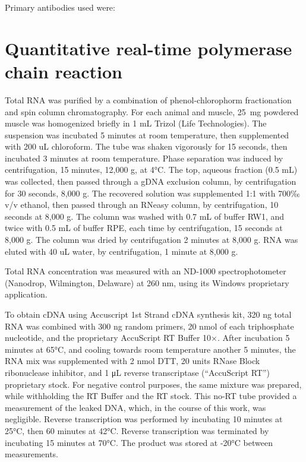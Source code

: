 \documentclass[12pt,english]{report}\usepackage[]{graphicx}\usepackage[]{color}
\begin{document}
Primary antibodies used were:


\section{Quantitative real-time polymerase chain reaction}

Total RNA was purified by a combination of phenol-chlorophorm fractionation
and spin column chromatography. For each animal and muscle, \SI{25}{\milli\gram}
powdered muscle was homogenized briefly in 1 mL Trizol (Life Technologies).
The suspension was incubated 5 minutes at room temperature, then supplemented
with 200 uL chloroform. The tube was shaken vigorously for 15 seconds,
then incubated 3 minutes at room temperature. Phase separation was
induced by centrifugation, 15 minutes, 12,000 g, at 4°C. The top,
aqueous fraction (0.5 mL) was collected, then passed through a gDNA
exclusion column, by centrifugation for 30 seconds, 8,000 g. The recovered
solution was supplemented 1:1 with 700‰ v/v ethanol, then passed through
an RNeasy column, by centrifugation, 10 seconds at 8,000 g. The column
was washed with 0.7 mL of buffer RW1, and twice with 0.5 mL of buffer
RPE, each time by centrifugation, 15 seconds at 8,000 g. The column
was dried by centrifugation 2 minutes at 8,000 g. RNA was eluted with
40 uL water, by centrifugation, 1 minute at 8,000 g.

Total RNA concentration was measured with an ND-1000 spectrophotometer
(Nanodrop, Wilmington, Delaware) at 260 nm, using its Windows proprietary
application.

To obtain cDNA using Accuscript 1st Strand cDNA synthesis kit, 320
ng total RNA was combined with 300 ng random primers, 20 nmol of each
triphosphate nucleotide, and the proprietary AccuScript RT Buffer
10×. After incubation 5 minutes at 65°C, and cooling towards room
temperature another 5 minutes, the RNA mix was supplemented with 2
nmol DTT, 20 units RNase Block ribonuclease inhibitor, and 1 μL reverse
transcriptase (“AccuScript RT”) proprietary stock. For negative control
purposes, the same mixture was prepared, while withholding the RT
Buffer and the RT stock. This no-RT tube provided a measurement of
the leaked DNA, which, in the course of this work, was negligible.
Reverse transcription was performed by incubating 10 minutes at 25°C,
then 60 minutes at 42°C. Reverse transcription was terminated by incubating
15 minutes at 70°C. The product was stored at -20°C between measurements.
\end{document}
